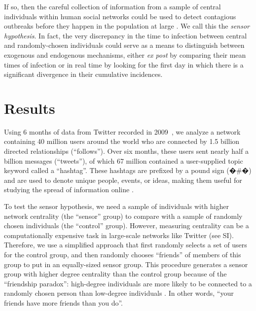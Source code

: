 If so, then the careful collection of information from a sample of central individuals within human social networks could be used to detect contagious outbreaks before they happen in the population at large \cite{22}.  We call this the {\it sensor hypothesis}.  In fact, the very discrepancy in the time to infection between central and randomly-chosen individuals could serve as a means to distinguish between exogenous and endogenous mechanisms, either {\it ex post} by comparing their mean times of infection or in real time by looking for the first day in which there is a significant divergence in their cumulative incidences.


\section*{Results}


Using 6 months of data from Twitter recorded in 2009~\cite{31}, we analyze a network containing 40 million users around the world who are connected by 1.5 billion directed relationships (``follows'').  Over six months, these users sent nearly half a billion messages (``tweets''), of which 67 million contained a user-supplied topic keyword called a ``hashtag''. These hashtags are prefixed by a pound sign (�\#�) and are used to denote unique people, events, or ideas, making them useful for studying the spread of information online \cite{25,26,27}.

To test the sensor hypothesis, we need a sample of individuals with higher network centrality (the ``sensor'' group) to compare with a sample of randomly chosen individuals (the ``control'' group).  However, measuring centrality can be a computationally expensive task in large-scale networks like Twitter (see SI).  Therefore, we use a simplified approach that first randomly selects a set of users for the control group, and then randomly chooses ``friends'' of members of this group to put in an equally-sized sensor group.  This procedure generates a sensor group with higher degree centrality than the control group because of the ``friendship paradox'': high-degree individuals are more likely to be connected to a randomly chosen person than low-degree individuals \cite{22,28}.  In other words, ``your friends have more friends than you do''.\cite{29}

